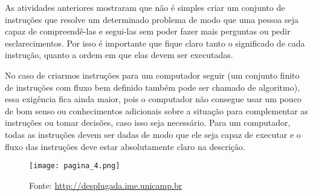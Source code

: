 \label{comp-arr1}

As atividades anteriores mostraram que não é simples criar um conjunto de instruções que resolve um determinado problema de modo que uma pessoa seja capaz de compreendê-las e segui-las sem poder fazer mais perguntas ou pedir esclarecimentos. Por isso é importante que fique claro tanto o significado de cada instrução, quanto a ordem em que elas devem ser executadas.

No caso de criarmos instruções para um computador seguir (um conjunto finito de instruções com fluxo bem definido também pode ser chamado de algoritmo), essa exigência fica ainda maior, pois o computador não consegue usar um pouco de bom senso ou conhecimentos adicionais sobre a situação para complementar as instruções ou tomar decisões, caso isso seja necessário. Para um computador, todas as instruções devem ser dadas de modo que ele seja capaz de executar e o fluxo das instruções deve estar absolutamente claro na descrição.

\begin{figure}[H]
\centering
\texttt{[image: pagina\_4.png]}
\caption{Fonte: \url{http://desplugada.ime.unicamp.br}}
\end{figure}

